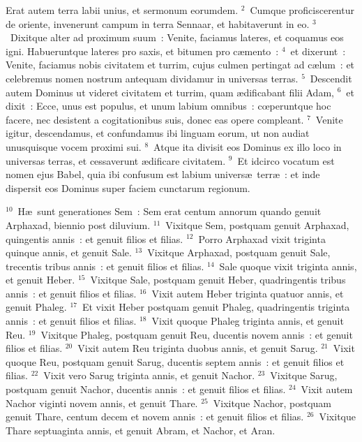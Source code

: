 \lettrine[lines=3,image=true,loversize=0.05,lraise=-0.03]{E}{}rat autem terra labii unius, et sermonum eorumdem.
${}^{2}$~Cumque proficiscerentur de oriente, invenerunt campum in terra Sennaar, et habitaverunt in eo.
${}^{3}$~Dixitque alter ad proximum suum~: Venite, faciamus lateres, et coquamus eos igni. Habueruntque lateres pro saxis, et bitumen pro c\ae mento~:
${}^{4}$~et dixerunt~: Venite, faciamus nobis civitatem et turrim, cujus culmen pertingat ad c\ae lum~: et celebremus nomen nostrum antequam dividamur in universas terras.
${}^{5}$~Descendit autem Dominus ut videret civitatem et turrim, quam \ae dificabant filii Adam,
${}^{6}$~et dixit~: Ecce, unus est populus, et unum labium omnibus~: cœperuntque hoc facere, nec desistent a cogitationibus suis, donec eas opere compleant.
${}^{7}$~Venite igitur, descendamus, et confundamus ibi linguam eorum, ut non audiat unusquisque vocem proximi sui.
${}^{8}$~Atque ita divisit eos Dominus ex illo loco in universas terras, et cessaverunt \ae dificare civitatem.
${}^{9}$~Et idcirco vocatum est nomen ejus Babel, quia ibi confusum est labium univers\ae\ terr\ae~: et inde dispersit eos Dominus super faciem cunctarum regionum.


${}^{10}$~H\ae\ sunt generationes Sem~: Sem erat centum annorum quando genuit Arphaxad, biennio post diluvium.
${}^{11}$~Vixitque Sem, postquam genuit Arphaxad, quingentis annis~: et genuit filios et filias.
${}^{12}$~Porro Arphaxad vixit triginta quinque annis, et genuit Sale.
${}^{13}$~Vixitque Arphaxad, postquam genuit Sale, trecentis tribus annis~: et genuit filios et filias.
${}^{14}$~Sale quoque vixit triginta annis, et genuit Heber.
${}^{15}$~Vixitque Sale, postquam genuit Heber, quadringentis tribus annis~: et genuit filios et filias.
${}^{16}$~Vixit autem Heber triginta quatuor annis, et genuit Phaleg.
${}^{17}$~Et vixit Heber postquam genuit Phaleg, quadringentis triginta annis~: et genuit filios et filias.
${}^{18}$~Vixit quoque Phaleg triginta annis, et genuit Reu.
${}^{19}$~Vixitque Phaleg, postquam genuit Reu, ducentis novem annis~: et genuit filios et filias.
${}^{20}$~Vixit autem Reu triginta duobus annis, et genuit Sarug.
${}^{21}$~Vixit quoque Reu, postquam genuit Sarug, ducentis septem annis~: et genuit filios et filias.
${}^{22}$~Vixit vero Sarug triginta annis, et genuit Nachor.
${}^{23}$~Vixitque Sarug, postquam genuit Nachor, ducentis annis~: et genuit filios et filias.
${}^{24}$~Vixit autem Nachor viginti novem annis, et genuit Thare.
${}^{25}$~Vixitque Nachor, postquam genuit Thare, centum decem et novem annis~: et genuit filios et filias.
${}^{26}$~Vixitque Thare septuaginta annis, et genuit Abram, et Nachor, et Aran.



